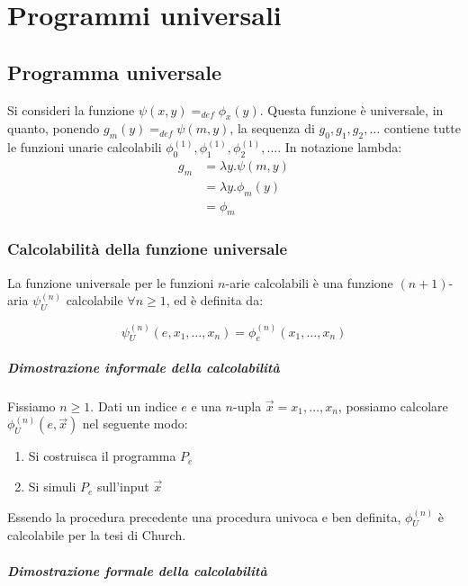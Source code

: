 	\chapter{Programmi universali}
	
	\section{Programma universale}
	Si consideri la funzione $\psi(x,y) =_{def} \phi_x(y)$. Questa funzione è universale, in quanto, ponendo $g_m(y) =_{def} \psi(m,y)$, la sequenza di $g_0, g_1, g_2, \dots$ contiene tutte le funzioni unarie calcolabili $\phi_0^{(1)}, \phi_1^{(1)}, \phi_2^{(1)}, \dots$.
	In notazione lambda:
	\begin{equation}
	\begin{aligned}
	g_m &= \lambda y.\psi(m,y)\\
	&= \lambda y.\phi_m(y)\\
	&= \phi_m
	\end{aligned}
	\end{equation}
	
	\subsection{Calcolabilità della funzione universale}
	La funzione universale per le funzioni $n$-arie calcolabili è una funzione $(n+1)$-aria $\psi_U^{(n)}$ calcolabile $\forall n \geq 1$, ed è definita da:
	
	\begin{equation}
	\psi_U^{(n)}(e, x_1, \dots, x_n) = \phi_e^{(n)}(x_1, \dots, x_n)
	\end{equation}
	
	\paragraph{Dimostrazione informale della calcolabilità}
	Fissiamo $n \geq 1$. Dati un indice $e$ e una $n$-upla $\vec{x} = x_1, \dots, x_n$, possiamo calcolare $\phi_U^{(n)}(e, \vec{x})$ nel seguente modo:
	\begin{enumerate}
		\item Si costruisca il programma $P_e$
		\item Si simuli $P_e$ sull'input $\vec{x}$
	\end{enumerate}
	Essendo	la procedura precedente una procedura univoca e ben definita,  $\phi_U^{(n)}$ è calcolabile per la tesi di Church.
	
	\paragraph{Dimostrazione formale della calcolabilità}
	
